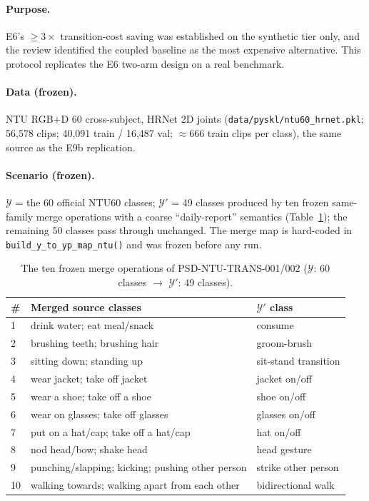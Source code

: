 \documentclass[11pt,a4paper]{article}
\begin{document}
\paragraph{Purpose.}
E6's $\geq 3\times$ transition-cost saving was established on the synthetic tier only, and the review identified the coupled baseline as the most expensive alternative. This protocol replicates the E6 two-arm design on a real benchmark.

\paragraph{Data (frozen).}
NTU RGB+D 60 cross-subject, HRNet 2D joints (\texttt{data/pyskl/ntu60\_hrnet.pkl}; 56{,}578 clips; 40{,}091 train / 16{,}487 val; $\approx$666 train clips per class), the same source as the E9b replication.

\paragraph{Scenario (frozen).}
$\mathcal{Y}$ = the 60 official NTU60 classes; $\mathcal{Y}'$ = 49 classes produced by ten frozen same-family merge operations with a coarse ``daily-report'' semantics (Table~\ref{tab:mergemap}); the remaining 50 classes pass through unchanged. The merge map is hard-coded in \texttt{build\_y\_to\_yp\_map\_ntu()} and was frozen before any run.

\begin{table}[h]
\centering
\caption{The ten frozen merge operations of PSD-NTU-TRANS-001/002 ($\mathcal{Y}$: 60 classes $\to$ $\mathcal{Y}'$: 49 classes).}\label{tab:mergemap}
\small
\begin{tabular}{lll}
\toprule
\# & Merged source classes & $\mathcal{Y}'$ class \\
\midrule
1 & drink water; eat meal/snack & consume \\
2 & brushing teeth; brushing hair & groom-brush \\
3 & sitting down; standing up & sit-stand transition \\
4 & wear jacket; take off jacket & jacket on/off \\
5 & wear a shoe; take off a shoe & shoe on/off \\
6 & wear on glasses; take off glasses & glasses on/off \\
7 & put on a hat/cap; take off a hat/cap & hat on/off \\
8 & nod head/bow; shake head & head gesture \\
9 & punching/slapping; kicking; pushing other person & strike other person \\
10 & walking towards; walking apart from each other & bidirectional walk \\
\bottomrule
\end{tabular}
\end{table}
\end{document}
